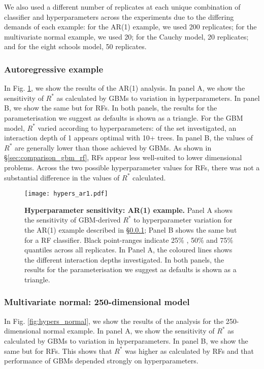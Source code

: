 \documentclass{article}
\begin{document}
We also used a different number of replicates at each unique combination of classifier and hyperparameters across the experiments due to the differing demands of each example: for the AR(1) example, we used 200 replicates; for the multivariate normal example, we used 20; for the Cauchy model, 20 replicates; and for the eight schools model, 50 replicates.


\subsubsection{Autoregressive example}\label{sec:hyperparameters_ar1}
In Fig. \ref{fig:hypers_ar1}, we show the results of the AR(1) analysis. In panel A, we show the sensitivity of $R^*$ as calculated by GBMs to variation in hyperparameters. In panel B, we show the same but for RFs. In both panels, the results for the parameterisation we suggest as defaults is shown as a triangle. For the GBM model, $R^*$ varied according to hyperparameters: of the set investigated, an interaction depth of 1 appears optimal with 10+ trees. In panel B, the values of $R^*$ are generally lower than those achieved by GBMs. As shown in \S\ref{sec:comparison_gbm_rf}, RFs appear less well-suited to lower dimensional problems. Across the two possible hyperparameter values for RFs, there was not a substantial difference in the values of $R^*$ calculated.

\begin{figure}[!htb]
	\centerline{\texttt{[image: hypers\_ar1.pdf]}}
	\caption{\textbf{Hyperparameter sensitivity: AR(1) example.} Panel A shows the sensitivity of GBM-derived $R^*$ to hyperparameter variation for the AR(1) example described in \S\ref{sec:hyperparameters_ar1}; Panel B shows the same but for a RF classifier. Black point-ranges indicate 25\% , 50\% and 75\% quantiles across all replicates. In Panel A, the coloured lines shows the different interaction depths investigated. In both panels, the results for the parameterisation we suggest as defaults is shown as a triangle.}
	\label{fig:hypers_ar1}
\end{figure}

\subsubsection{Multivariate normal: 250-dimensional model}\label{sec:hyperparameters_normal}
In Fig. \ref{fig:hypers_normal}, we show the results of the analysis for the 250-dimensional normal example. In panel A, we show the sensitivity of $R^*$ as calculated by GBMs to variation in hyperparameters. In panel B, we show the same but for RFs. This shows that $R^*$ was higher as calculated by RFs and that performance of GBMs depended strongly on hyperparameters.
\end{document}
